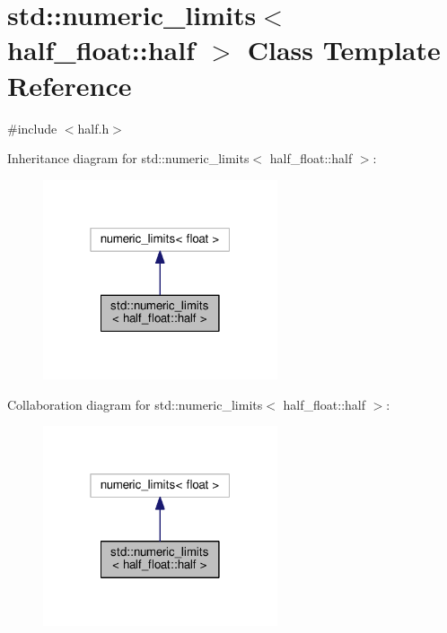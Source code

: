 \hypertarget{classstd_1_1numeric__limits_3_01half__float_1_1half_01_4}{}\section{std\+:\+:numeric\+\_\+limits$<$ half\+\_\+float\+:\+:half $>$ Class Template Reference}
\label{classstd_1_1numeric__limits_3_01half__float_1_1half_01_4}


{\ttfamily \#include $<$half.\+h$>$}



Inheritance diagram for std\+:\+:numeric\+\_\+limits$<$ half\+\_\+float\+:\+:half $>$\+:
\nopagebreak
\begin{figure}[H]
\begin{center}
\leavevmode
\includegraphics[width=196pt]{classstd_1_1numeric__limits_3_01half__float_1_1half_01_4__inherit__graph}
\end{center}
\end{figure}


Collaboration diagram for std\+:\+:numeric\+\_\+limits$<$ half\+\_\+float\+:\+:half $>$\+:
\nopagebreak
\begin{figure}[H]
\begin{center}
\leavevmode
\includegraphics[width=196pt]{classstd_1_1numeric__limits_3_01half__float_1_1half_01_4__coll__graph}
\end{center}
\end{figure}
